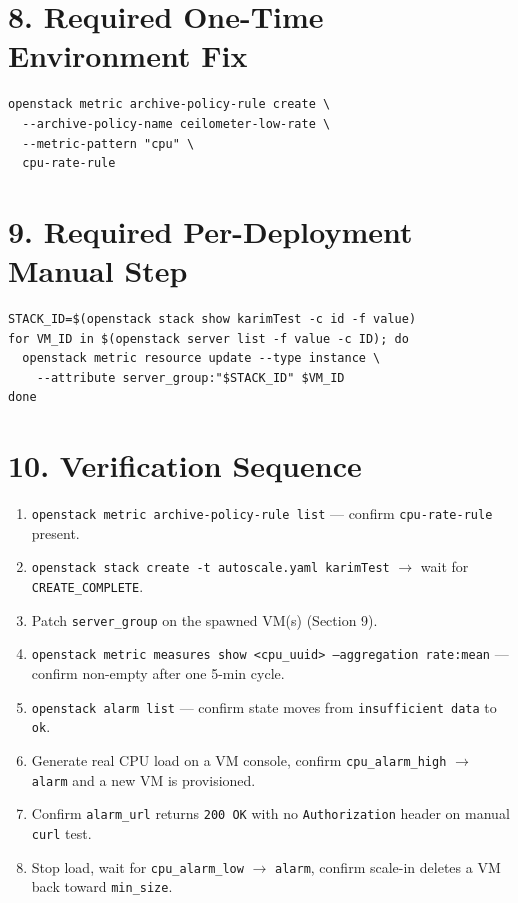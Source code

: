 \documentclass[10pt,a4paper]{article}
\begin{document}
\section*{8. Required One-Time Environment Fix}
\begin{lstlisting}
openstack metric archive-policy-rule create \
  --archive-policy-name ceilometer-low-rate \
  --metric-pattern "cpu" \
  cpu-rate-rule
\end{lstlisting}

\section*{9. Required Per-Deployment Manual Step}
\begin{lstlisting}
STACK_ID=$(openstack stack show karimTest -c id -f value)
for VM_ID in $(openstack server list -f value -c ID); do
  openstack metric resource update --type instance \
    --attribute server_group:"$STACK_ID" $VM_ID
done
\end{lstlisting}

\section*{10. Verification Sequence}
\begin{enumerate}
    \item \texttt{openstack metric archive-policy-rule list} --- confirm \texttt{cpu-rate-rule} present.
    \item \texttt{openstack stack create -t autoscale.yaml karimTest} $\to$ wait for \texttt{CREATE\_COMPLETE}.
    \item Patch \texttt{server\_group} on the spawned VM(s) (Section 9).
    \item \texttt{openstack metric measures show <cpu\_uuid> --aggregation rate:mean} --- confirm non-empty after one 5-min cycle.
    \item \texttt{openstack alarm list} --- confirm state moves from \texttt{insufficient data} to \texttt{ok}.
    \item Generate real CPU load on a VM console, confirm \texttt{cpu\_alarm\_high} $\to$ \texttt{alarm} and a new VM is provisioned.
    \item Confirm \texttt{alarm\_url} returns \texttt{200 OK} with no \texttt{Authorization} header on manual \texttt{curl} test.
    \item Stop load, wait for \texttt{cpu\_alarm\_low} $\to$ \texttt{alarm}, confirm scale-in deletes a VM back toward \texttt{min\_size}.
\end{enumerate}
\end{document}
